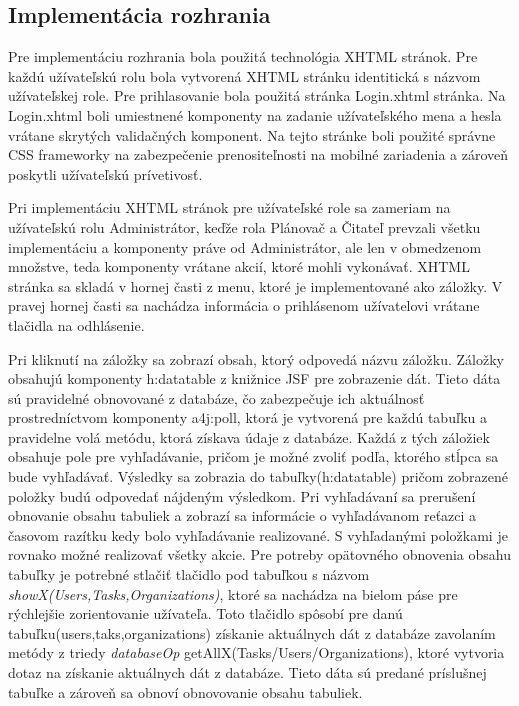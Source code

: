 \subsection{Implementácia rozhrania}
Pre implementáciu rozhrania bola použitá technológia XHTML stránok. Pre každú užívateľskú rolu bola vytvorená XHTML stránku identitická s názvom užívateľskej role. Pre prihlasovanie bola použitá  stránka Login.xhtml stránka. Na Login.xhtml boli umiestnené komponenty na zadanie užívateľského mena a hesla vrátane skrytých validačných komponent. Na tejto stránke boli použité správne CSS frameworky na zabezpečenie prenositeľnosti na mobilné zariadenia a zároveň poskytli užívateľskú prívetivosť.

Pri implementáciu XHTML stránok pre užívateľské role sa zameriam na užívateľskú rolu Administrátor, keďže rola Plánovač a Čitateľ prevzali všetku implementáciu a komponenty práve od Administrátor, ale len v obmedzenom množstve, teda komponenty vrátane akcií, ktoré mohli vykonávať. XHTML stránka sa skladá v hornej časti z menu, ktoré je implementované ako záložky. V pravej hornej časti sa nachádza informácia o prihlásenom užívatelovi vrátane tlačidla na odhlásenie.  


Pri kliknutí na záložky sa zobrazí obsah, ktorý odpovedá názvu záložku. Záložky  obsahujú komponenty h:datatable z knižnice JSF pre zobrazenie dát. Tieto dáta sú pravidelné obnovované z databáze, čo zabezpečuje ich aktuálnosť prostredníctvom komponenty a4j:poll, ktorá je vytvorená pre každú tabuľku a pravidelne volá metódu, ktorá získava údaje z databáze. Každá z tých záložiek obsahuje pole pre vyhľadávanie, pričom je možné zvoliť podľa, ktorého stĺpca sa bude vyhľadávať. Výsledky sa zobrazia do tabuľky(h:datatable) pričom zobrazené položky budú odpovedať nájdeným výsledkom. Pri vyhľadávaní sa prerušení obnovanie obsahu tabuliek a zobrazí sa informácie o vyhľadávanom reťazci a časovom razítku kedy bolo vyhľadávanie realizované. S vyhľadanými položkami je rovnako možné realizovať všetky akcie. Pre potreby opätovného obnovenia obsahu tabuľky je potrebné stlačiť tlačidlo pod tabuľkou s názvom \emph{showX(Users,Tasks,Organizations)}, ktoré sa nachádza na bielom páse pre rýchlejšie zorientovanie užívateľa. Toto tlačidlo spôsobí pre danú tabuľku(users,taks,organizations) získanie aktuálnych dát z databáze zavolaním metódy z triedy \emph{databaseOp} getAllX(Tasks/Users/Organizations), ktoré vytvoria dotaz na získanie aktuálnych dát z databáze. Tieto dáta sú predané príslušnej tabuľke a zároveň sa obnoví obnovovanie obsahu tabuliek.

